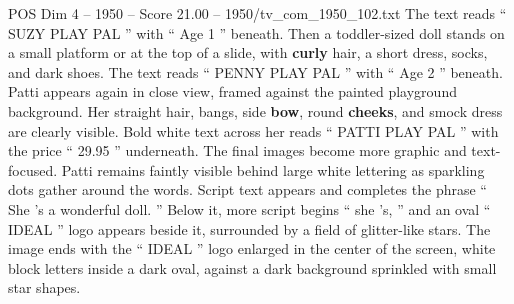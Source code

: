\begin{textsample}{POS Dim 4 – 1950 – Score 21.00 – 1950/tv\_com\_1950\_102.txt}
The text reads “ SUZY PLAY PAL ” with “ Age 1 ” beneath.
Then a toddler-sized doll stands on a small platform or at the top of a slide, with \textbf{curly} hair, a short dress, socks, and dark shoes.
The text reads “ PENNY PLAY PAL ” with “ Age 2 ” beneath.
Patti appears again in close view, framed against the painted playground background.
Her straight hair, bangs, side \textbf{bow}, round \textbf{cheeks}, and smock dress are clearly visible.
Bold white text across her reads “ PATTI PLAY PAL ” with the price “ 29.95 ” underneath.
The final images become more graphic and text-focused.
Patti remains faintly visible behind large white lettering as sparkling dots gather around the words.
Script text appears and completes the phrase “ She ’s a wonderful doll. ” Below it, more script begins “ she ’s, ” and an oval “ IDEAL ” logo appears beside it, surrounded by a field of glitter-like stars.
The image ends with the “ IDEAL ” logo enlarged in the center of the screen, white block letters inside a dark oval, against a dark background sprinkled with small star shapes.

\end{textsample}

